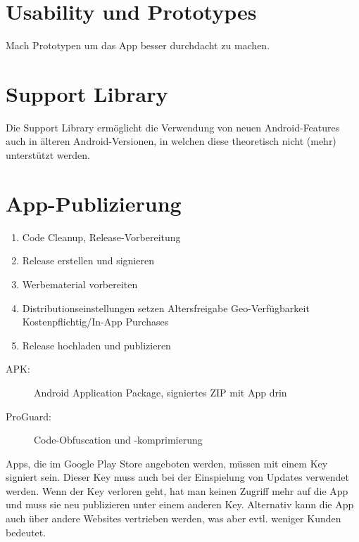 \documentclass[a4paper, 11pt]{article}
\begin{document}
\section{Usability und Prototypes}
Mach Prototypen um das App besser durchdacht zu machen.

\section{Support Library}
Die Support Library ermöglicht die Verwendung von neuen Android-Features auch in älteren Android-Versionen, in welchen diese theoretisch nicht (mehr) unterstützt werden.

\section{App-Publizierung}
\begin{multicols}{2}
	\begin{enumerate}
		\item Code Cleanup, Release-Vorbereitung
		\item Release erstellen und signieren
		\item Werbematerial vorbereiten
	\columnbreak
		\item Distributionseinstellungen setzen
			\subitem Altersfreigabe
			\subitem Geo-Verfügbarkeit
			\subitem Kostenpflichtig/In-App Purchases
		\item Release hochladen und publizieren
	\end{enumerate}
\end{multicols}

\begin{description}
	\item[APK: ] Android Application Package, signiertes ZIP mit App drin
	\item[ProGuard: ] Code-Obfuscation und -komprimierung
\end{description}

Apps, die im Google Play Store angeboten werden, müssen mit einem Key signiert sein. Dieser Key muss auch bei der Einspielung von Updates verwendet werden. Wenn der Key verloren geht, hat man keinen Zugriff mehr auf die App und muss sie neu publizieren unter einem anderen Key. Alternativ kann die App auch über andere Websites vertrieben werden, was aber evtl. weniger Kunden bedeutet.
\end{document}
